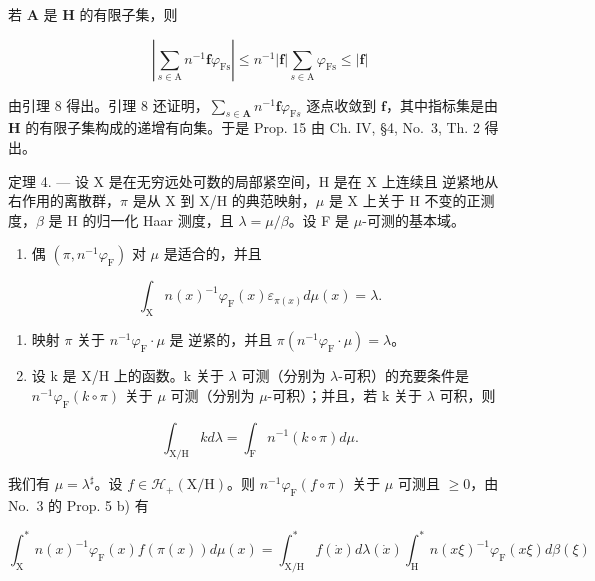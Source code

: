 若 \(\mathbf{A}\) 是 \(\mathbf{H}\) 的有限子集，则

\[
\left| \sum_ {s \in \mathrm{A}} n ^ {- 1} \mathbf {f} \varphi_ {\mathrm{Fs}} \right| \leqslant n ^ {- 1} | \mathbf {f} | \sum_ {s \in \mathrm{A}} \varphi_ {\mathrm{Fs}} \leqslant | \mathbf {f} |
\]

由引理 8 得出。引理 8 还证明，\(\sum_{s\in\mathbf{A}}n^{-1}\mathbf{f}\varphi_{\mathrm{F}s}\) 逐点收敛到 \(\mathbf{f}\)，其中指标集是由 \(\mathbf{H}\) 的有限子集构成的递增有向集。于是 Prop. 15 由 Ch. IV, §4, No.~3, Th. 2 得出。

定理 4. --- 设 X 是在无穷远处可数的局部紧空间，H 是在 X 上连续且 逆紧地从右作用的离散群，\(\pi\) 是从 X 到 X/H 的典范映射，\(\mu\) 是 X 上关于 H 不变的正测度，\(\beta\) 是 H 的归一化 Haar 测度，且 \(\lambda = \mu/\beta\)。设 F 是 \(\mu\)-可测的基本域。

\begin{enumerate}
\def\labelenumi{\alph{enumi})}
\tightlist
\item
  偶 \((\pi, n^{-1}\varphi_{\mathrm{F}})\) 对 \(\mu\) 是适合的，并且
\end{enumerate}

\[
\int_ {\mathrm{X}} n (x) ^ {- 1} \varphi_ {\mathrm{F}} (x) \varepsilon_ {\pi (x)} d \mu (x) = \lambda .
\]

\begin{enumerate}
\def\labelenumi{\alph{enumi})}
\setcounter{enumi}{1}
\item
  映射 \(\pi\) 关于 \(n^{-1}\varphi_{\mathrm{F}}\cdot \mu\) 是 逆紧的，并且 \(\pi (n^{-1}\varphi_{\mathrm{F}}\cdot \mu) = \lambda\)。
\item
  设 k 是 X/H 上的函数。k 关于 \(\lambda\) 可测（分别为 \(\lambda\)-可积）的充要条件是 \(n^{-1}\varphi_{\mathrm{F}}(k\circ\pi)\) 关于 \(\mu\) 可测（分别为 \(\mu\)-可积）；并且，若 k 关于 \(\lambda\) 可积，则
\end{enumerate}

\[
\int_ {\mathrm{X/H}} k d \lambda = \int_ {\mathrm{F}} n ^ {- 1} (k \circ \pi) d \mu .
\]

我们有 \(\mu = \lambda^{\sharp}\)。设 \(f \in \mathcal{H}_{+}(\mathrm{X / H})\)。则 \(n^{-1}\varphi_{\mathrm{F}}(f \circ \pi)\) 关于 \(\mu\) 可测且 \(\geqslant 0\)，由 No.~3 的 Prop. 5 b) 有

\[
\int_ {\mathrm{X}} ^ {*} n (x) ^ {- 1} \varphi_ {\mathrm{F}} (x) f (\pi (x)) d \mu (x) = \int_ {\mathrm{X/H}} ^ {*} f (\dot {x}) d \lambda (\dot {x}) \int_ {\mathrm{H}} ^ {*} n (x \xi) ^ {- 1} \varphi_ {\mathrm{F}} (x \xi) d \beta (\xi)
\]

